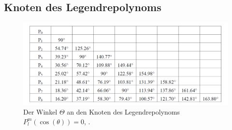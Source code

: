 \begin{appendix}
\section{Knoten des Legendrepolynoms}

\begin{figure}
  \centering  \includegraphics[width=\textwidth]{ressources/WinkelLegendre.png}  \caption{Der Winkel $\Theta$ an den Knoten des Legendrepolynoms $P^{m}_{l}(\cos{(\theta)}) = 0$, \cite{skript}.} \label{fig:Anh1}
\end{figure}
% 

\end{appendix}
